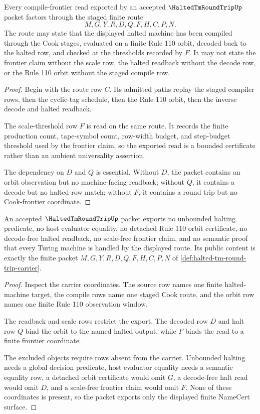 \begin{theorem}
\label{thm:halted-tm-round-trip-scale-threshold-route}
Every compile-frontier read exported by an accepted $\HaltedTmRoundTripUp$ packet factors through the staged finite route
$$
M,G,Y,R,D,Q,F,H,C,P,N .
$$
The route may state that the displayed halted machine has been compiled through the Cook stages, evaluated on a finite Rule 110 orbit, decoded back to the halted row, and checked at the thresholds recorded by $F$. It may not state the frontier claim without the scale row, the halted readback without the decode row, or the Rule 110 orbit without the staged compile row.
\end{theorem}
\begin{proof}
Begin with the route row $C$. Its admitted paths replay the staged compiler rows, then the cyclic-tag schedule, then the Rule 110 orbit, then the inverse decode and halted readback.

The scale-threshold row $F$ is read on the same route. It records the finite production count, tape-symbol count, row-width budget, and step-budget threshold used by the frontier claim, so the exported read is a bounded certificate rather than an ambient universality assertion.

The dependency on $D$ and $Q$ is essential. Without $D$, the packet contains an orbit observation but no machine-facing readback; without $Q$, it contains a decode but no halted-row match; without $F$, it contains a round trip but no Cook-frontier coordinate.
\end{proof}

\begin{theorem}
\label{thm:halted-tm-round-trip-nonescape}
An accepted $\HaltedTmRoundTripUp$ packet exports no unbounded halting predicate, no host evaluator equality, no detached Rule 110 orbit certificate, no decode-free halted readback, no scale-free frontier claim, and no semantic proof that every Turing machine is handled by the displayed route. Its public content is exactly the finite packet $M,G,Y,R,D,Q,F,H,C,P,N$ of \autoref{def:halted-tm-round-trip-carrier}.
\end{theorem}
\begin{proof}
Inspect the carrier coordinates. The source row names one finite halted-machine target, the compile rows name one staged Cook route, and the orbit row names one finite Rule 110 observation window.

The readback and scale rows restrict the export. The decoded row $D$ and halt row $Q$ bind the orbit to the named halted output, while $F$ binds the read to a finite frontier coordinate.

The excluded objects require rows absent from the carrier. Unbounded halting needs a global decision predicate, host evaluator equality needs a semantic equality row, a detached orbit certificate would omit $G$, a decode-free halt read would omit $D$, and a scale-free frontier claim would omit $F$. None of these coordinates is present, so the packet exports only the displayed finite NameCert surface.
\end{proof}

